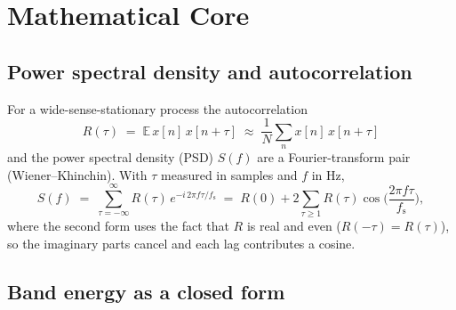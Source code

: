 \documentclass[11pt]{article}
\newcommand{\R}{R}
\newcommand{\fs}{f_{\mathrm{s}}}
\begin{document}
\section{Mathematical Core}

\subsection{Power spectral density and autocorrelation}

For a wide-sense-stationary process the autocorrelation
\begin{equation}
  \R(\tau) \;=\; \mathbb{E}\,x[n]\,x[n+\tau]
  \;\approx\; \frac{1}{N}\sum_n x[n]\,x[n+\tau]
  \label{eq:acf}
\end{equation}
and the power spectral density (PSD) $S(f)$ are a Fourier-transform pair
(Wiener--Khinchin). With $\tau$ measured in samples and $f$ in Hz,
\begin{equation}
  S(f) \;=\; \sum_{\tau=-\infty}^{\infty} \R(\tau)\,
             e^{-i\,2\pi f \tau/\fs}
       \;=\; \R(0) + 2\sum_{\tau\ge 1}\R(\tau)\cos\!\Big(\frac{2\pi f\tau}{\fs}\Big),
  \label{eq:psd}
\end{equation}
where the second form uses the fact that $\R$ is real and even
($\R(-\tau)=\R(\tau)$), so the imaginary parts cancel and each lag contributes a
cosine.

\subsection{Band energy as a closed form}
\end{document}
